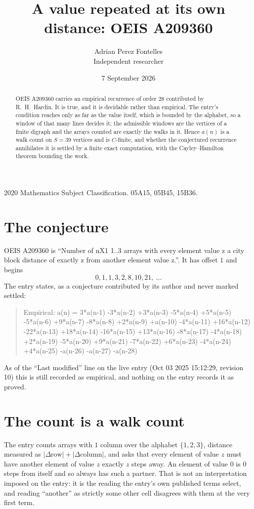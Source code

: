 \documentclass[11pt,a4paper]{article}
\title{A value repeated at its own distance: OEIS A209360}
\author{Adrian Perez Fontelles\\ \small Independent researcher}
\date{7 September 2026}
\theoremstyle{plain}
\theoremstyle{definition}
\begin{document}
\maketitle

\begin{abstract}
OEIS A209360 carries an empirical recurrence of order $28$ contributed by R.~H.~Hardin. It is
true, and it is decidable rather than empirical. The entry's condition reaches only as far as the value itself, which is bounded by the
alphabet, so a window of that many lines decides it; the
admissible windows are the vertices of a finite digraph and the arrays counted are exactly the
walks in it. Hence $a(n)$ is a walk count on $S=39$ vertices and is $C$-finite, and whether the
conjectured recurrence annihilates it is settled by a finite exact computation, with the
Cayley--Hamilton theorem bounding the work.
\end{abstract}

\noindent\small 2020 Mathematics Subject Classification. 05A15, 05B45, 15B36.\normalsize

\section{The conjecture}

OEIS A209360 is ``Number of nX1 1..3 arrays with every element value z a city block distance of exactly z from another element value z.''. It has offset $1$ and begins
\[
0, 1, 1, 3, 2, 8, 10, 21,\ \dots
\]
The entry states, as a conjecture contributed by its author and never marked settled:
\begin{quote}
Empirical: a(n) = 3*a(n-1) -3*a(n-2) +3*a(n-3) -5*a(n-4) +5*a(n-5) -5*a(n-6) +9*a(n-7) -8*a(n-8) +2*a(n-9) +a(n-10) -4*a(n-11) +16*a(n-12) -22*a(n-13) +18*a(n-14) -16*a(n-15) +13*a(n-16) -8*a(n-17) -4*a(n-18) +2*a(n-19) -5*a(n-20) +9*a(n-21) -7*a(n-22) +6*a(n-23) -4*a(n-24) +4*a(n-25) -a(n-26) -a(n-27) -a(n-28)
\end{quote}
As of the ``Last modified'' line on the live entry (Oct 03 2025 15:12:29, revision 10) this is still
recorded as empirical, and nothing on the entry records it as proved.

\section{The count is a walk count}

The entry counts arrays with $1$ column over the alphabet $\{1,2,3\}$, distance measured as $|\Delta \text{row}|+|\Delta \text{column}|$, and asks that every element of value $z$ must have another element of value $z$ exactly $z$ steps away. An element of value $0$ is $0$ steps from itself and so always has such a partner. That is not an interpretation imposed on the entry: it is the reading the entry's own published terms select, and reading ``another'' as strictly some other cell disagrees with them at the very first term.
\end{document}
